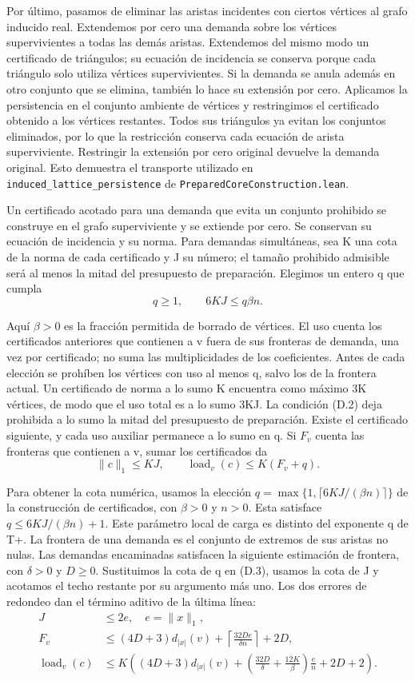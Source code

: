 \documentclass[spanish,11pt,a4paper]{article}
\begin{document}
Por último, pasamos de eliminar las aristas incidentes con ciertos vértices al grafo inducido real. Extendemos por cero una demanda sobre los vértices supervivientes a todas las demás aristas. Extendemos del mismo modo un certificado de triángulos; su ecuación de incidencia se conserva porque cada triángulo solo utiliza vértices supervivientes. Si la demanda se anula además en otro conjunto que se elimina, también lo hace su extensión por cero. Aplicamos la persistencia en el conjunto ambiente de vértices y restringimos el certificado obtenido a los vértices restantes. Todos sus triángulos ya evitan los conjuntos eliminados, por lo que la restricción conserva cada ecuación de arista superviviente. Restringir la extensión por cero original devuelve la demanda original. Esto demuestra el transporte utilizado en \texttt{induced\_\allowbreak{}lattice\_\allowbreak{}persistence} de \texttt{Prepared\allowbreak{}Core\allowbreak{}Construction.\allowbreak{}lean}.

Un certificado acotado para una demanda que evita un conjunto prohibido se construye en el grafo superviviente y se extiende por cero. Se conservan su ecuación de incidencia y su norma. Para demandas simultáneas, sea K una cota de la norma de cada certificado y J su número; el tamaño prohibido admisible será al menos la mitad del presupuesto de preparación. Elegimos un entero q que cumpla
\[q\geq1,\qquad 6KJ\leq q\beta n. \tag{D.2}\]

Aquí \(\beta>0\) es la fracción permitida de borrado de vértices. El uso cuenta los certificados anteriores que contienen a v fuera de sus fronteras de demanda, una vez por certificado; no suma las multiplicidades de los coeficientes. Antes de cada elección se prohíben los vértices con uso al menos q, salvo los de la frontera actual. Un certificado de norma a lo sumo K encuentra como máximo 3K vértices, de modo que el uso total es a lo sumo 3KJ. La condición (D.2) deja prohibida a lo sumo la mitad del presupuesto de preparación. Existe el certificado siguiente, y cada uso auxiliar permanece a lo sumo en q. Si \(F_v\) cuenta las fronteras que contienen a v, sumar los certificados da
\[\|c\|_1\leq KJ,\qquad \operatorname{load}_v(c)\leq K(F_v+q). \tag{D.3}\]

Para obtener la cota numérica, usamos la elección \(q=\max\{1,\lceil6KJ/(\beta n)\rceil\}\) de la construcción de certificados, con \(\beta>0\) y \(n>0\). Esta satisface \(q\leq6KJ/(\beta n)+1\). Este parámetro local de carga es distinto del exponente q de T+. La frontera de una demanda es el conjunto de extremos de sus aristas no nulas. Las demandas encaminadas satisfacen la siguiente estimación de frontera, con \(\delta>0\) y \(D\geq0\). Sustituimos la cota de q en (D.3), usamos la cota de J y acotamos el techo restante por su argumento más uno. Los dos errores de redondeo dan el término aditivo de la última línea:
\[\begin{aligned}J&\leq2e,\quad e=\|x\|_1,\\ F_v&\leq(4D+3)d_{|x|}(v)+\left\lceil\frac{32De}{\delta n}\right\rceil+2D,\\ \operatorname{load}_v(c)&\leq K\left((4D+3)d_{|x|}(v)+\left(\frac{32D}{\delta}+\frac{12K}{\beta}\right)\frac e n+2D+2\right).\end{aligned}\tag{D.4}\]
\end{document}
